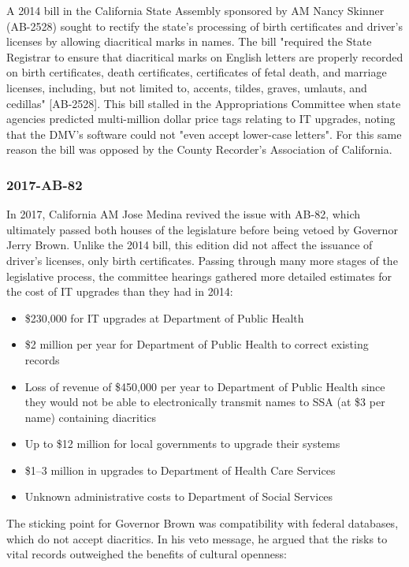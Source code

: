 A 2014 bill in the California State Assembly sponsored by AM Nancy Skinner
(AB-2528) sought to rectify the state's processing of birth certificates and
driver's licenses by allowing diacritical marks in names. The bill "required the
State Registrar to ensure that diacritical marks on English letters are properly
recorded on birth certificates, death certificates, certificates of fetal death,
and marriage licenses, including, but not limited to, accents, tildes, graves,
umlauts, and cedillas" {[}AB-2528{]}. This bill stalled in the Appropriations
Committee when state agencies predicted multi-million dollar price tags relating
to IT upgrades, noting that the DMV's software could not "even accept lower-case
letters". For this same reason the bill was opposed by the County Recorder's
Association of California.

\subsubsection{2017-AB-82}

In 2017, California AM Jose Medina revived the issue with AB-82, which
ultimately passed both houses of the legislature before being vetoed by
Governor Jerry Brown. Unlike the 2014 bill, this edition did not affect
the issuance of driver's licenses, only birth certificates. Passing
through many more stages of the legislative process, the committee
hearings gathered more detailed estimates for the cost of IT upgrades
than they had in 2014:

\begin{itemize}
\item
  \$230,000 for IT upgrades at Department of Public Health
\item
  \$2 million per year for Department of Public Health to correct
  existing records
\item
  Loss of revenue of \$450,000 per year to Department of Public Health
  since they would not be able to electronically transmit names to SSA
  (at \$3 per name) containing diacritics
\item
  Up to \$12 million for local governments to upgrade their systems
\item
  \$1--3 million in upgrades to Department of Health Care Services
\item
  Unknown administrative costs to Department of Social Services
\end{itemize}

The sticking point for Governor Brown was compatibility with federal databases,
which do not accept diacritics. In his veto message, he argued that the risks to
vital records outweighed the benefits of cultural openness:

